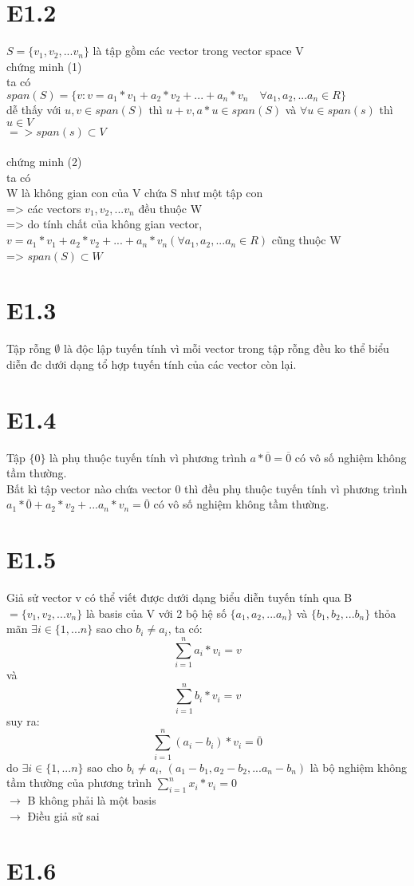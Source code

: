 \documentclass[a4paper,11pt]{article}
\theoremstyle{mytheor}
\begin{document}
\section*{E1.2}
$S = \{v_1,v_2,... v_n\}$ là tập gồm các vector trong vector space V\\
chứng minh (1)\\
ta có
\\ $span(S) = \{v: v=a_1*v_1+a_2*v_2+...+a_n*v_n \quad \forall a_1,a_2,...a_n \in R\}$
\\ dễ thấy với $u, v \in span(S)$ thì $u+v,a*u \in span(S)$ và $\forall u \in span(s)$ thì $u \in V$
\\ $=> span(s) \subset V$\\
\\
chứng minh (2)\\
ta có\\
W là không gian con của V chứa S như một tập con\\
=> các vectors $v_1,v_2,... v_n$ đều thuộc W\\
=> do tính chất của không gian vector, $v = a_1*v_1+a_2*v_2+...+a_n*v_n (\forall a_1,a_2,...a_n \in R) $ cũng thuộc W\\
=> $span(S) \subset W$
\section*{E1.3}
Tập rỗng $\emptyset$ là độc lập tuyến tính vì mỗi vector trong tập rỗng đều ko thể biểu diễn đc dưới dạng tổ hợp tuyến tính của các vector còn lại.
\section*{E1.4}
Tập $\{0\}$ là phụ thuộc tuyến tính vì phương trình $a*\overline{0}=\overline{0}$ có vô số nghiệm không tầm thường.\\
Bất kì tập vector nào chứa vector 0 thì đều phụ thuộc tuyến tính vì phương trình $a_1*\overline{0}+a_2*v_2+...a_n*v_n = \overline{0}$ có vô số nghiệm không tầm thường. 
\section*{E1.5}
Giả sử vector v có thể viết được dưới dạng biểu diễn tuyến tính qua B $=\{v_1,v_2,...v_n\}$ là basis của V với 2 bộ hệ số $\{a_1,a_2,...a_n\}$ và $\{b_1,b_2,...b_n\}$ thỏa mãn $\exists i \in \{1,...n\}$ sao cho $ b_i \ne a_i$, ta có:\\
$$\sum\limits_{i=1}^n a_i*v_i = v$$
và 
$$\sum\limits_{i=1}^n b_i*v_i = v$$
suy ra:
$$\sum\limits_{i=1}^n (a_i-b_i)*v_i = \overline{0}$$
do $\exists i \in \{1,...n\}$ sao cho $ b_i \ne a_i$, $(a_1-b_1, a_2-b_2,... a_n-b_n)$ là bộ nghiệm không tầm thường của phương trình $\sum\limits_{i=1}^n x_i*v_i = 0$
\\ $\rightarrow$ B không phải là một basis
\\ $\rightarrow$ Điều giả sử sai

\section*{E1.6}


\end{document}
